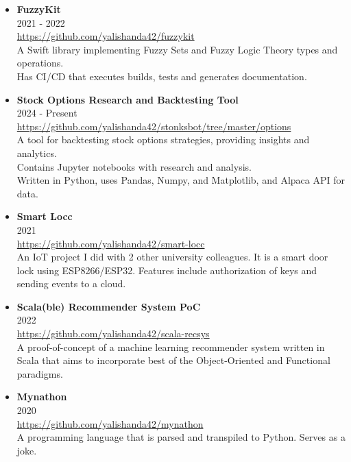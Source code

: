 \documentclass[11pt,a4paper]{article}
\begin{document}
\begin{itemize}[leftmargin=*]
    \item \textbf{FuzzyKit} \\
    2021 - 2022 \\
    \href{https://github.com/yalishanda42/fuzzykit}{https://github.com/yalishanda42/fuzzykit} \\
    A Swift library implementing Fuzzy Sets and Fuzzy Logic Theory types and operations. \\
    Has CI/CD that executes builds, tests and generates documentation.

    \item \textbf{Stock Options Research and Backtesting Tool} \\
    2024 - Present \\
    \href{https://github.com/yalishanda42/stonksbot/tree/master/options}{https://github.com/yalishanda42/stonksbot/tree/master/options} \\
    A tool for backtesting stock options strategies, providing insights and analytics. \\
    Contains Jupyter notebooks with research and analysis. \\
    Written in Python, uses Pandas, Numpy, and Matplotlib, and Alpaca API for data.
    
    \item \textbf{Smart Locc} \\
    2021 \\
    \href{https://github.com/yalishanda42/smart-locc}{https://github.com/yalishanda42/smart-locc} \\
    An IoT project I did with 2 other university colleagues. It is a smart door lock using ESP8266/ESP32.
    Features include authorization of keys and sending events to a cloud.

    \item \textbf{Scala(ble) Recommender System PoC} \\
    2022 \\
    \href{https://github.com/yalishanda42/scala-recsys}{https://github.com/yalishanda42/scala-recsys} \\
    A proof-of-concept of a machine learning recommender system written in Scala that aims to incorporate
    best of the Object-Oriented and Functional paradigms. 

    \item \textbf{Mynathon} \\
    2020 \\
    \href{https://github.com/yalishanda42/mynathon}{https://github.com/yalishanda42/mynathon} \\
    A programming language that is parsed and transpiled to Python. Serves as a joke.


\end{itemize}
\end{document}
